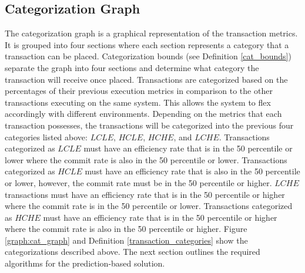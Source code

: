 \subsection{Categorization Graph}
\label{section_cat_graph}


The categorization graph is a graphical representation of the transaction metrics. It is grouped into four sections where each section represents a category that a transaction can be placed. Categorization bounds (see Definition \ref{cat_bounds}) separate the graph into four sections and determine what category the transaction will receive once placed. Transactions are categorized based on the percentages of their previous execution metrics in comparison to the other transactions executing on the same system. This allows the system to flex accordingly with different environments. Depending on the metrics that each transaction possesses, the transactions will be categorized into the previous four categories listed above: $LCLE$, $HCLE$, $HCHE$, and $LCHE$. Transactions categorized as $LCLE$ must have an efficiency rate that is in the 50 percentile or lower where the commit rate is also in the 50 percentile or lower. Transactions categorized as $HCLE$ must have an efficiency rate that is also in the 50 percentile or lower, however, the commit rate must be in the 50 percentile or higher. $LCHE$ transactions must have an efficiency rate that is in the 50 percentile or higher where the commit rate is in the 50 percentile or lower. Transactions categorized as $HCHE$ must have an efficiency rate that is in the 50 percentile or higher where the commit rate is also in the 50 percentile or higher. Figure \ref{graph:cat_graph} and Definition \ref{transaction_categories} show the categorizations described above. The next section outlines the required algorithms for the prediction-based solution.

